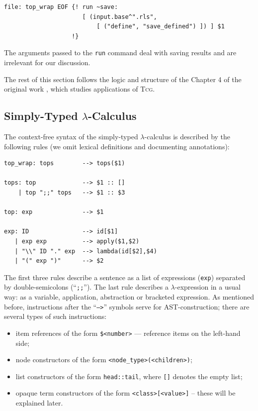 \documentclass[a4paper,12pt]{article}
\newcommand{\Tcg}{\textsc{Tcg}}
\newcommand{\code}[1]{\texttt{#1}}
\begin{document}
\begin{verbatim}
file: top_wrap EOF {! run ~save: 
                      [ (input.base^".rls",
                          [ ("define", "save_defined") ]) ] $1 
                   !}
\end{verbatim}

The arguments passed to the \code{run} command deal with saving results and are irrelevant for our discussion.

The rest of this section follows the logic and structure of the Chapter 4 of the original work \cite{Tcg}, which studies applications of \Tcg{}. 

\subsection{Simply-Typed $\lambda$-Calculus}

The context-free syntax of the simply-typed $\lambda$-calculus is described by the following rules (we omit lexical definitions and documenting annotations):

\begin{verbatim}
top_wrap: tops        --> tops($1)

tops: top             --> $1 :: []
    | top ";;" tops   --> $1 :: $3

top: exp              --> $1

exp: ID               --> id[$1]
   | exp exp          --> apply($1,$2)
   | "\\" ID "." exp  --> lambda(id[$2],$4)
   | "(" exp ")"      --> $2
\end{verbatim}

The first three rules describe a sentence as a list of expressions (\code{exp}) separated by double-semicolons (``\code{;;}''). The last rule describes a $\lambda$-expression in a usual way: as a variable, application, abstraction or bracketed expression. As mentioned before, instructions after the ``\code{-->}'' symbols serve for AST-construction; there are several types of such instructions:
\begin{itemize}
 \item item references of the form \code{\$<number>} --- reference items on the left-hand side;
 \item node constructors of the form \code{<node_type>(<children>)};
 \item list constructors of the form \code{head::tail}, where \code{[]} denotes the empty list;
 \item opaque term constructors of the form \code{<class>[<value>]} -- these will be explained later.
\end{itemize}
\end{document}
